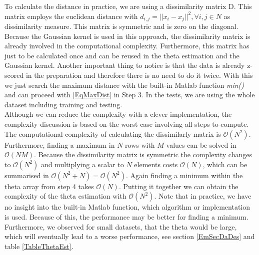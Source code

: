 \FloatBarrier
To calculate the distance in practice, we are using a dissimilarity matrix D.
This matrix employs the euclidean distance with $d_{i,j}=||x_i-x_j||^2, \forall i,j \in N$ as dissimilarity measure.
This matrix is symmetric and is zero on the diagonal.\cite[p. 22,299]{Gentle.2007}\newline
Because the Gaussian kernel is used in this approach, the dissimilarity matrix is already involved in the computational complexity.
Furthermore, this matrix has just to be calculated once and can be reused in the theta estimation and the Gaussian kernel.
Another important thing to notice is that the data is already z-scored in the preparation and therefore there is no need to do it twice.
With this we just search the maximum distance with the built-in Matlab function \textit{min()} and can proceed with \eqref{EqMaxDist} in Step 3.
In the tests, we are using the whole dataset including training and testing.\\
Although we can reduce the complexity with a clever implementation, the complexity discussion is based on the worst case involving all steps to compute.
The computational complexity of calculating the dissimilarly matrix is $\mathcal{O}(N^2)$.\cite{Kobti.2007}
Furthermore, finding a maximum in $N$ rows with $M$ values can be solved in $\mathcal{O}(NM)$.
Because the dissimilarity matrix is symmetric the complexity changes to $\mathcal{O}(N^2)$ and multiplying a scalar to $N$ elements costs $\mathcal{O}(N)$, which can be summarised in $\mathcal{O}(N^2+N)=\mathcal{O}(N^2)$.
Again finding a minimum within the theta array from step 4 takes $\mathcal{O}(N)$.
Putting it together we can obtain the complexity of the theta estimation with $\mathcal{O}(N^2)$.
Note that in practice, we have no insight into the built-in Matlab function, which algorithm or implementation is used.
Because of this, the performance may be better for finding a minimum.
Furthermore, we observed for small datasets, that the theta would be large, which will eventually lead to a worse performance, see section \ref{EmSecDaDes} and table \ref{TableThetaEst}.
